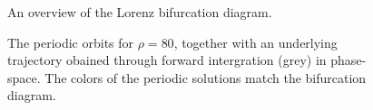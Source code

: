 \begin{figure}
\centering{}
\caption{
	An overview of the Lorenz bifurcation diagram.
}
\label{fig:lorenzfull}
\end{figure}


\begin{figure}
\centering{}
\caption{
	The periodic orbits for $\rho=80$, together with an underlying trajectory obained through forward intergration (grey) in phase-space.
	The colors of the periodic solutions match the bifurcation diagram.
}
\label{fig:lorenzcut}
\end{figure}

\restoregeometry
